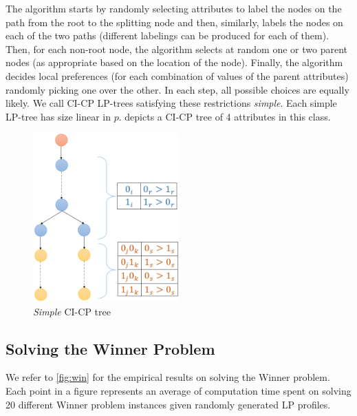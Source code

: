 The algorithm starts by randomly selecting attributes to label the nodes on 
the path from the root to the splitting node and then, similarly, labels 
the nodes on each of the two paths (different labelings can be produced
for each of them). Then, for each non-root node, the algorithm selects at random
one or two parent nodes (as appropriate based on the location of the node).
Finally, the algorithm decides 
local preferences (for each combination of values of the parent attributes)
randomly picking one over the other. In each step, all 
possible choices are equally likely. We call CI-CP LP-trees satisfying 
these restrictions \emph{simple}. Each simple LP-tree has size 
linear in $p$.   depicts a CI-CP tree of 
4 attributes in this class. 
\begin{figure}
\centering
	\includegraphics[width=0.5\textwidth]{img/simple_LP_tree.png}
\caption{\emph{Simple} CI-CP tree}
\label{fig:MSCICP_tree}
\end{figure}



\subsection{Solving the Winner Problem}

We refer to \ref{fig:win} for the empirical results on solving the Winner problem.  
Each point in a figure represents
an average of computation time spent on solving 20 different 
Winner problem instances given randomly
generated LP profiles.

